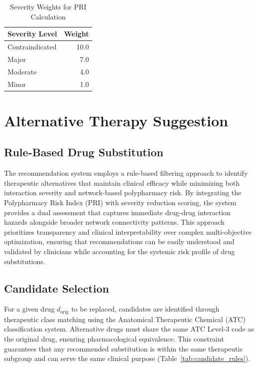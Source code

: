 \documentclass[11pt,a4paper]{article}
\begin{document}
\begin{table}[H]
\centering
\caption{Severity Weights for PRI Calculation}
\label{tab:severity_weights}
\begin{tabular}{lr}
\toprule
\textbf{Severity Level} & \textbf{Weight} \\
\midrule
Contraindicated & 10.0 \\
Major & 7.0 \\
Moderate & 4.0 \\
Minor & 1.0 \\
\bottomrule
\end{tabular}
\end{table}

\section{Alternative Therapy Suggestion}

\subsection{Rule-Based Drug Substitution}

The recommendation system employs a rule-based filtering approach to identify therapeutic alternatives that maintain clinical efficacy while minimizing both interaction severity and network-based polypharmacy risk. By integrating the Polypharmacy Risk Index (PRI) with severity reduction scoring, the system provides a dual assessment that captures immediate drug-drug interaction hazards alongside broader network connectivity patterns. This approach prioritizes transparency and clinical interpretability over complex multi-objective optimization, ensuring that recommendations can be easily understood and validated by clinicians while accounting for the systemic risk profile of drug substitutions.

\subsection{Candidate Selection}

For a given drug $d_{\text{orig}}$ to be replaced, candidates are identified through therapeutic class matching using the Anatomical Therapeutic Chemical (ATC) classification system. Alternative drugs must share the same ATC Level-3 code as the original drug, ensuring pharmacological equivalence. This constraint guarantees that any recommended substitution is within the same therapeutic subgroup and can serve the same clinical purpose (Table~\ref{tab:candidate_rules}).
\end{document}
